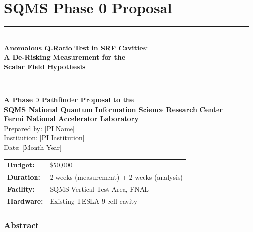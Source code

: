 \documentclass[11pt]{article}
\begin{document}
\part{SQMS Phase 0 Proposal}
\label{part:proposal}


\begin{center}
\rule{\textwidth}{1.5pt}\\[12pt]
{\LARGE \textbf{Anomalous Q-Ratio Test in SRF Cavities:}}\\[6pt]
{\LARGE \textbf{A De-Risking Measurement for the}}\\[6pt]
{\LARGE \textbf{Scalar Field Hypothesis}}\\[12pt]
\rule{\textwidth}{1.5pt}\\[18pt]

{\large \textbf{A Phase 0 Pathfinder Proposal to the}}\\[4pt]
{\large \textbf{SQMS National Quantum Information Science Research Center}}\\[4pt]
{\large \textbf{Fermi National Accelerator Laboratory}}\\[18pt]

{\large Prepared by: [PI Name]}\\[4pt]
{\large Institution: [PI Institution]}\\[4pt]
{\large Date: [Month Year]}\\[18pt]

\begin{tabular}{ll}
\textbf{Budget:} & \$50,000 \\
\textbf{Duration:} & 2 weeks (measurement) + 2 weeks (analysis) \\
\textbf{Facility:} & SQMS Vertical Test Area, FNAL \\
\textbf{Hardware:} & Existing TESLA 9-cell cavity \\
\end{tabular}
\end{center}

\newpage


\section{Abstract}
\label{sec:abstract}
\end{document}
